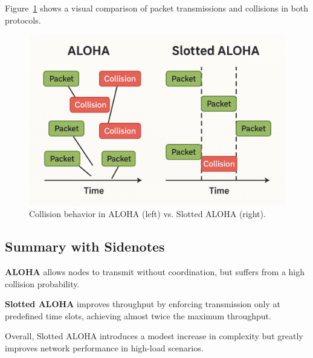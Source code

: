 Figure~\ref{fig:aloha-diagram} shows a visual comparison of packet transmissions and collisions in both protocols.

\begin{figure}[h]
\centering
\includegraphics[width=0.8\linewidth]{../figures/aloha.png}
\caption{Collision behavior in ALOHA (left) vs. Slotted ALOHA (right).}
\label{fig:aloha-diagram}
\end{figure}

\subsection{Summary with Sidenotes}

\textbf{ALOHA} allows nodes to transmit without coordination, but suffers from a high collision probability.

\textbf{Slotted ALOHA} improves throughput by enforcing transmission only at predefined time slots, achieving almost twice the maximum throughput.

Overall, Slotted ALOHA introduces a modest increase in complexity but greatly improves network performance in high-load scenarios.

